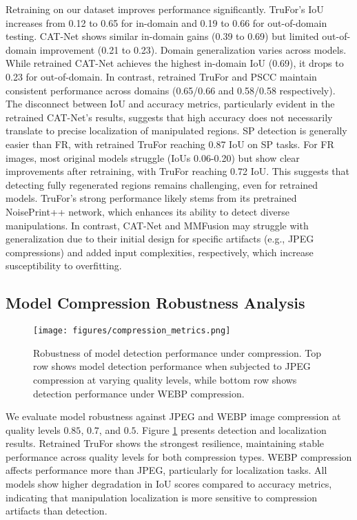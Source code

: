 Retraining on our dataset improves performance significantly. TruFor's IoU increases from 0.12 to 0.65 for in-domain and 0.19 to 0.66 for out-of-domain testing. CAT-Net shows similar in-domain gains (0.39 to 0.69) but limited out-of-domain improvement (0.21 to 0.23). Domain generalization varies across models. While retrained CAT-Net achieves the highest in-domain IoU (0.69), it drops to 0.23 for out-of-domain. In contrast, retrained TruFor and PSCC maintain consistent performance across domains (0.65/0.66 and 0.58/0.58 respectively). The disconnect between IoU and accuracy metrics, particularly evident in the retrained CAT-Net's results, suggests that high accuracy does not necessarily translate to precise localization of manipulated regions. SP detection is generally easier than FR, with retrained TruFor reaching 0.87 IoU on SP tasks. For FR images, most original models struggle (IoUs 0.06-0.20) but show clear improvements after retraining, with TruFor reaching 0.72 IoU. This suggests that detecting fully regenerated regions remains challenging, even for retrained models. TruFor’s strong performance likely stems from its pretrained NoisePrint++ network, which enhances its ability to detect diverse manipulations. In contrast, CAT-Net and MMFusion may struggle with generalization due to their initial design for specific artifacts (e.g., JPEG compressions) and added input complexities, respectively, which increase susceptibility to overfitting.

\subsection{Model Compression Robustness Analysis}

\begin{figure}[!htb]
    \centering
    \texttt{[image: figures/compression\_metrics.png]}
    \label{fig:compression_metrics}
    \caption{Robustness of model detection performance under compression. Top row shows model detection performance when subjected to JPEG compression at varying quality levels, while bottom row shows detection performance under WEBP compression.} 
    \label{fig:compression_det}
\end{figure}


We evaluate model robustness against JPEG and WEBP image compression at quality levels $0.85$, $0.7$, and $0.5$. Figure \ref{fig:compression_det} presents detection and localization results. Retrained TruFor shows the strongest resilience, maintaining stable performance across quality levels for both compression types. WEBP compression affects performance more than JPEG, particularly for localization tasks. All models show higher degradation in IoU scores compared to accuracy metrics, indicating that manipulation localization is more sensitive to compression artifacts than detection.


